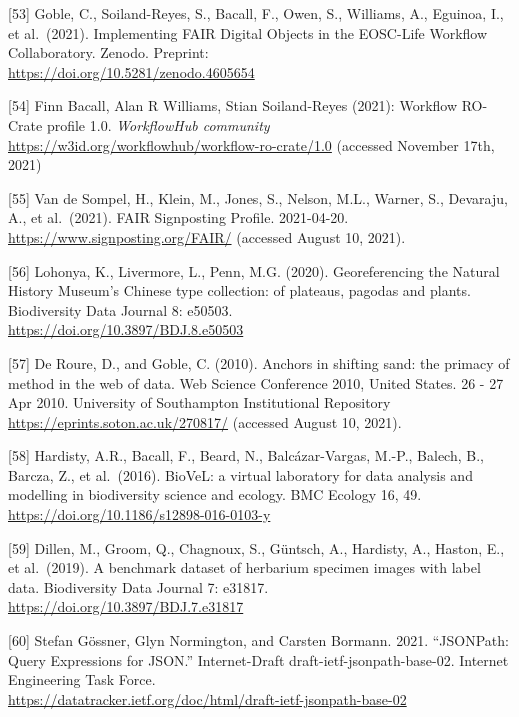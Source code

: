 {[}53{]} Goble, C., Soiland-Reyes, S., Bacall, F., Owen, S., Williams,
A., Eguinoa, I., et al.~(2021). Implementing FAIR Digital Objects in the
EOSC-Life Workflow Collaboratory. Zenodo. Preprint:\\
\url{https://doi.org/10.5281/zenodo.4605654}

{[}54{]} Finn Bacall, Alan R Williams, Stian Soiland-Reyes (2021):
Workflow RO-Crate profile 1.0. \emph{WorkflowHub community}\\
\url{https://w3id.org/workflowhub/workflow-ro-crate/1.0} (accessed
November 17th, 2021)

{[}55{]} Van de Sompel, H., Klein, M., Jones, S., Nelson, M.L., Warner,
S., Devaraju, A., et al.~(2021). FAIR Signposting Profile. 2021-04-20.\\
\url{https://www.signposting.org/FAIR/} (accessed August 10, 2021).

{[}56{]} Lohonya, K., Livermore, L., Penn, M.G. (2020). Georeferencing
the Natural History Museum's Chinese type collection: of plateaus,
pagodas and plants. Biodiversity Data Journal 8: e50503.\\
\url{https://doi.org/10.3897/BDJ.8.e50503}

{[}57{]} De Roure, D., and Goble, C. (2010). Anchors in shifting sand:
the primacy of method in the web of data. Web Science Conference 2010,
United States. 26 - 27 Apr 2010. University of Southampton Institutional
Repository\\
\url{https://eprints.soton.ac.uk/270817/} (accessed August 10, 2021).

{[}58{]} Hardisty, A.R., Bacall, F., Beard, N., Balcázar-Vargas, M.-P.,
Balech, B., Barcza, Z., et al.~(2016). BioVeL: a virtual laboratory for
data analysis and modelling in biodiversity science and ecology. BMC
Ecology 16, 49.\\
\url{https://doi.org/10.1186/s12898-016-0103-y}

{[}59{]} Dillen, M., Groom, Q., Chagnoux, S., Güntsch, A., Hardisty, A.,
Haston, E., et al.~(2019). A benchmark dataset of herbarium specimen
images with label data. Biodiversity Data Journal 7: e31817.\\
\url{https://doi.org/10.3897/BDJ.7.e31817}

{[}60{]} Stefan Gössner, Glyn Normington, and Carsten Bormann. 2021.
``JSONPath: Query Expressions for JSON.'' Internet-Draft
draft-ietf-jsonpath-base-02. Internet Engineering Task Force.\\
\url{https://datatracker.ietf.org/doc/html/draft-ietf-jsonpath-base-02}

